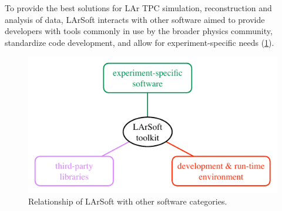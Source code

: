 
%
%

To provide the best solutions for LAr TPC simulation, reconstruction and
analysis of data, LArSoft interacts with other software aimed to
provide developers with tools commonly in use by the broader physics community,
standardize code development,
and allow for experiment-specific needs (\cref{fig:LArSoftRelations}).
\begin{figure}
   \centering
   \includegraphics{figures/LArSoftEnvironmentOverview}
   \caption{\label{fig:LArSoftRelations}
      Relationship of LArSoft with other software categories.
   }
\end{figure}

